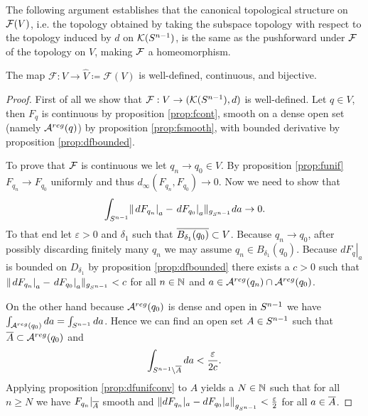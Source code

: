 The following argument establishes that the canonical topological structure on ${\mathcal{F}}(V)$, i.e. the topology obtained by taking the subspace topology with respect to the topology induced by $d$ on ${\mathcal{K}}({S^{n-1}})$, is the same as the pushforward under ${\mathcal{F}}$ of the topology on $V$, making ${\mathcal{F}}$ a homeomorphism.
\begin{lemma}\label{lem:Fprop}
The map $\mathcal{F}:V\to\widehat{V}\coloneqq \mathcal{F}(V)$ is well-defined, continuous, and bijective.
\end{lemma}
\begin{proof}
First of all we show that $\mathcal{F}:V\to ({\mathcal{K}}({S^{n-1}}),d)$ is well-defined. Let $q\in V$, then $F_q$ is continuous by proposition \ref{prop:fcont}, smooth on a dense open set (namely ${{\mathcal{A}}^{reg}}(q)$) by proposition \ref{prop:fsmooth}, with bounded derivative by proposition \ref{prop:dfbounded}.

To prove that $\mathcal{F}$ is continuous we let $q_n\to q_0 \in V$. By proposition \ref{prop:funif} $F_{q_n}\to F_{q_0}$ uniformly and thus $d_\infty(F_{q_n},F_{q_0})\to 0$. Now we need to show that 
\[
    \int_{{S^{n-1}}} \lVert \left.dF_{q_n}\right\rvert_a - \left.dF_{q_0}\right\rvert_a \rVert_{g_{S^{n-1}}}da \to 0.
\]
To that end let $\varepsilon>0$ and $\delta_1$ such that ${\overline{B_{\delta_1}(q_0)}}\subset V$. Because $q_n\to q_0$, after possibly discarding finitely many $q_n$ we may assume $q_n \in B_{\delta_1}(q_0)$. 
Because $\left.dF_{q}\right\rvert_a$ is bounded on $D_{\delta_1}$ by proposition \ref{prop:dfbounded} there exists a $c>0$ such that $\lVert \left.dF_{q_n}\right\rvert_a - \left.dF_{q_0}\right\rvert_a \rVert_{g_{S^{n-1}}}<c$ for all $n\in \mathbb{N}$ and $a\in {{\mathcal{A}}^{reg}}(q_n)\cap {{\mathcal{A}}^{reg}}(q_0)$. 

On the other hand because ${{\mathcal{A}}^{reg}}(q_0)$ is dense and open in ${S^{n-1}}$ we have $\int_{{{\mathcal{A}}^{reg}}(q_0)}da=\int_{{S^{n-1}}}da$. Hence we can find an open set $A\in {S^{n-1}}$ such that ${\overline{A}}\subset {{\mathcal{A}}^{reg}}(q_0)$ and 
\[
    \int_{{S^{n-1}} \setminus {\overline{A}}}da< \frac{\varepsilon}{2c}.
\]
Applying proposition \ref{prop:dfunifconv} to $A$ yields a $N\in \mathbb{N}$ such that for all $n\ge N$ we have $F_{q_n}\rvert_{{\overline{A}}}$ smooth and $\left\lVert dF_{q_n}\rvert_{a} - dF_{q_0}\rvert_{a}\right\rVert_{g_{{S^{n-1}}}}<\frac{\varepsilon}{2}$ for all $a\in {\overline{A}}$.


\end{proof}
